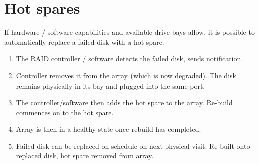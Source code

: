 \section{Hot spares}
\label{sec:hot-spares}

If hardware / software capabilities and available drive bays allow, it
is possible to automatically replace a failed disk with a hot spare.

\begin{enumerate}
\item
  The RAID controller / software detects the failed disk, sends
  notification.
\item
  Controller removes it from the array (which is now degraded). The disk
  remains physically in its bay and plugged into the same port.
\item
  The controller/software then adds the hot spare to the array. Re-build
  commences on to the hot spare.
\item
  Array is then in a healthy state once rebuild has completed.
\item
  Failed disk can be replaced on schedule on next physical visit.
  Re-built onto replaced disk, hot spare removed from array.
\end{enumerate}
